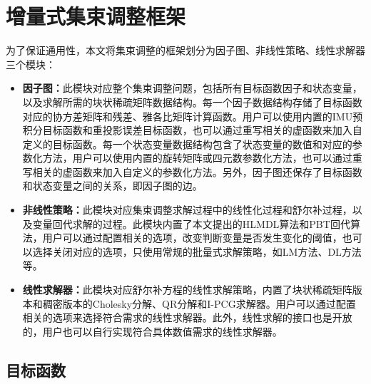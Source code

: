 \section{增量式集束调整框架}\label{sec:framework}

为了保证通用性，本文将集束调整的框架划分为因子图、非线性策略、线性求解器三个模块：
\begin{itemize}
    \item \textbf{因子图：}此模块对应整个集束调整问题，包括所有目标函数因子和状态变量，以及求解所需的块状稀疏矩阵数据结构。每一个因子数据结构存储了目标函数对应的协方差矩阵和残差、雅各比矩阵计算函数。用户可以使用内置的IMU预积分目标函数和重投影误差目标函数，也可以通过重写相关的虚函数来加入自定义的目标函数。每一个状态变量数据结构包含了状态变量的数值和对应的参数化方法，用户可以使用内置的旋转矩阵或四元数参数化方法，也可以通过重写相关的虚函数来加入自定义的参数化方法。另外，因子图还保存了目标函数和状态变量之间的关系，即因子图的边。
    \item \textbf{非线性策略：}此模块对应集束调整求解过程中的线性化过程和舒尔补过程，以及变量回代求解的过程。此模块内置了本文提出的HLMDL算法和PBT回代算法，用户可以通过配置相关的选项，改变判断变量是否发生变化的阈值，也可以选择关闭对应的选项，只使用常规的批量式求解策略，如LM方法、DL方法等。
    \item \textbf{线性求解器：}此模块对应舒尔补方程的线性求解策略，内置了块状稀疏矩阵版本和稠密版本的Cholesky分解、QR分解和I-PCG求解器。用户可以通过配置相关的选项来选择符合需求的线性求解器。此外，线性求解的接口也是开放的，用户也可以自行实现符合具体数值需求的线性求解器。
\end{itemize}

\subsection{目标函数}

